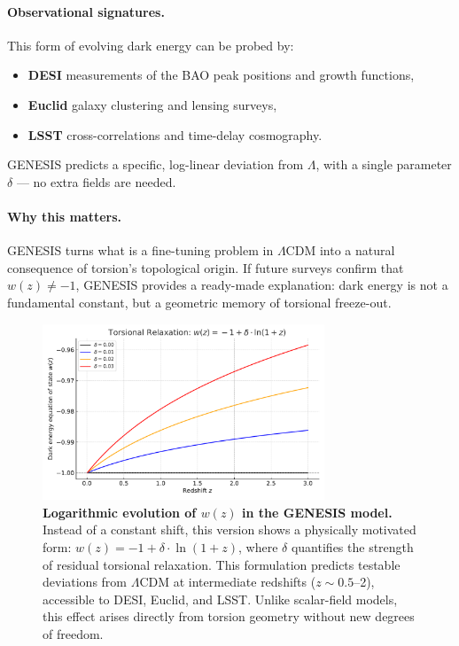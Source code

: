 \documentclass{article}
\begin{document}
\paragraph{Observational signatures.}
This form of evolving dark energy can be probed by:
\begin{itemize}
    \item \textbf{DESI} measurements of the BAO peak positions and growth functions,
    \item \textbf{Euclid} galaxy clustering and lensing surveys,
    \item \textbf{LSST} cross-correlations and time-delay cosmography.
\end{itemize}
GENESIS predicts a specific, log-linear deviation from $\Lambda$, with a single parameter $\delta$ — no extra fields are needed.

\paragraph{Why this matters.}
GENESIS turns what is a fine-tuning problem in $\Lambda$CDM into a natural consequence of torsion’s topological origin.
If future surveys confirm that $w(z) \neq -1$, GENESIS provides a ready-made explanation: dark energy is not a fundamental constant, but a geometric memory of torsional freeze-out.

\begin{figure}[h!]
    \centering
    \includegraphics[width=0.75\textwidth]{Fig_1162b_wz_log_evolution.pdf}
    \caption{
    \textbf{Logarithmic evolution of $w(z)$ in the GENESIS model.}
    Instead of a constant shift, this version shows a physically motivated form: $w(z) = -1 + \delta \cdot \ln(1 + z)$,
    where $\delta$ quantifies the strength of residual torsional relaxation. This formulation predicts testable deviations from $\Lambda$CDM at intermediate redshifts ($z \sim 0.5$–2), accessible to DESI, Euclid, and LSST. Unlike scalar-field models, this effect arises directly from torsion geometry without new degrees of freedom.
    }
    \label{fig:wz_log_evolution}
\end{figure}
\end{document}
